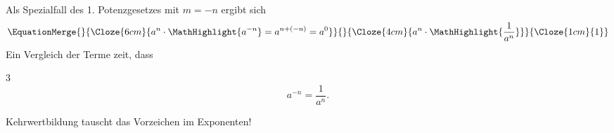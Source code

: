 \begin{RemarkBox}[remark title=Negative Exponenten und Kehrwerte]
  Als Spezialfall des 1. Potenzgesetzes mit $m=-n$ ergibt sich
  \[
  \EquationMerge
    {}
    {\Cloze{6cm}{a^n\cdot\MathHighlight{a^{-n}}=a^{n+(-n)}=a^0}}
    {}
    {\Cloze{4cm}{a^n\cdot\MathHighlight{\frac{1}{a^n}}}}
    {\Cloze{1cm}{1}}
  \]
  Ein Vergleich der Terme zeit, dass
  \begin{ClozeArea}[8]{3}
    \[
      a^{-n}=\frac{1}{a^n}.
    \]
  \end{ClozeArea}
  Kehrwertbildung tauscht das Vorzeichen im Exponenten!
\end{RemarkBox}
